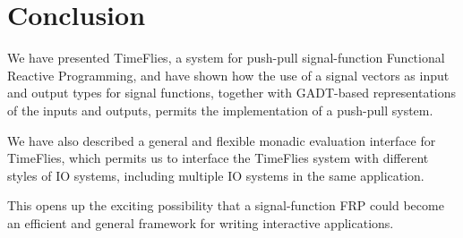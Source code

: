 \section{Conclusion}
\label{section:Conclusion}

We have presented TimeFlies, a system for push-pull signal-function Functional
Reactive Programming, and have shown how the use of a signal vectors as input
and output types for signal functions, together with GADT-based representations
of the inputs and outputs, permits the implementation of a push-pull system.

We have also described a general and flexible monadic evaluation interface for
TimeFlies, which permits us to interface the TimeFlies system with different
styles of IO systems, including multiple IO systems in the same application.

This opens up the exciting possibility that a signal-function FRP could become
an efficient and general framework for writing interactive applications.


